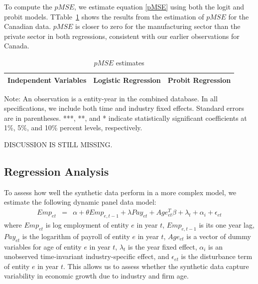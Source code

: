 To compute the $pMSE$, we estimate equation \ref{pMSE} using both the logit and probit models. TTable~\ref{tab:pMSE_regression} shows the results from the estimation of $pMSE$ for the Canadian data.
$pMSE$ is closer to zero for the manufacturing sector than the private sector in both regressions, consistent with our earlier observations for Canada.

\begin{table}[H]
  \centering
\begin{threeparttable}
 \caption{$pMSE$ estimates} \label{tab:pMSE_regression} \medskip
\renewcommand{\arraystretch}{1}
\begin{tabular}{l|c c| c c}
\toprule
\textbf{Independent Variables}&\multicolumn{2}{c|}{\textbf{Logistic Regression}} &  \multicolumn{2}{c}{\textbf{Probit Regression}}\\
\midrule

   \bottomrule
  \end{tabular} 
\begin{tablenotes}
\small
\item Note: An observation is a entity-year in the combined database. In all specifications, we include both time and industry fixed effects. Standard errors are in parentheses.  ***, **, and * indicate statistically significant coefficients at 1\%, 5\%, and 10\% percent levels, respectively.
 \end{tablenotes}
 \end{threeparttable}
\end{table}

DISCUSSION IS STILL MISSING.

\subsection{Regression Analysis}

To assess how well the synthetic data perform in a more complex model, we estimate  the following dynamic panel data model:
\begin{eqnarray}	
Emp_{et} & = & \alpha + \theta Emp_{e,t-1} + \lambda Pay_{et} + Age_{et}^{T}\beta + \lambda_t + \alpha_i + \epsilon_{et}
\end{eqnarray}
where $Emp_{et}$ is log employment of entity $e$ in year $t$, $Emp_{e,t-1}$ is its one year lag, $Pay_{et}$ is the logarithm of payroll of entity $e$ in year $t$, $Age_{et}$ is a vector of dummy variables for age of entity $e$ in year $t$, $\lambda_t$ is the year fixed effect, $\alpha_i$ is an unobserved time-invariant industry-specific effect, and $\epsilon_{et}$ is the disturbance term of entity $e$ in year $t$. This allows us to assess whether the synthetic data capture variability in economic growth due to industry and firm age.

